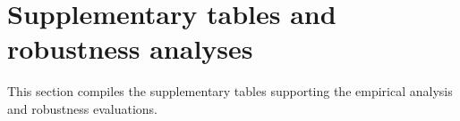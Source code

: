 \section{Supplementary tables and robustness analyses}
\label{app:tables}

This section compiles the supplementary tables supporting the empirical analysis and robustness evaluations.









